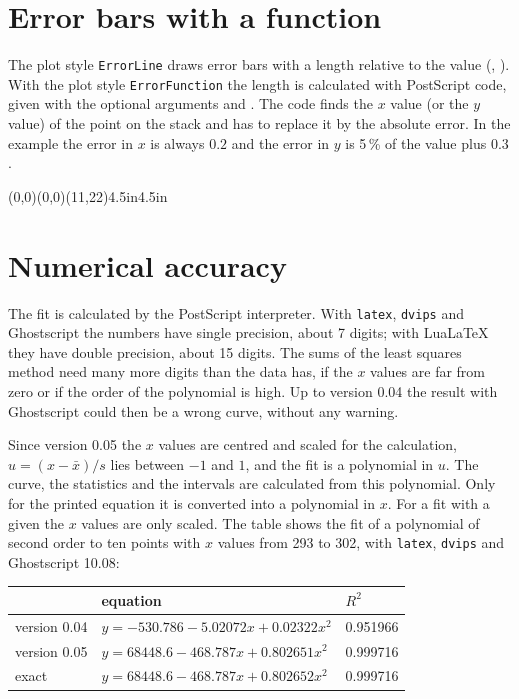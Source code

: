 \documentclass[11pt,english,BCOR10mm,DIV12,bibliography=totoc,parskip=false,
   smallheadings, headexclude,footexclude,oneside]{pst-doc}
\let\Section\section
\def\section{\clearpage\Section}
\begin{document}
\section{Error bars with a function}
The plot style \texttt{ErrorLine} draws error bars with a length relative to
the value (, ). With the plot style
\texttt{ErrorFunction} the length is calculated with PostScript code, given with the
optional arguments  and . The code finds the
$x$ value (or the $y$ value) of the point on the stack and has to replace it by
the absolute error. In the example the error in $x$ is always $0.2$ and
the error in $y$ is 5\,\% of the value plus $0.3$.

\begin{LTXexample}[pos=t]
\begin{psgraph}[arrows=->,Dy=2](0,0)(0,0)(11,22){4.5in}{4.5in}
\listplot[plotstyle=ErrorFunction,arrows=|-|,arrowscale=0.5,
  xerrfunc=pop 0.2,yerrfunc=0.05 mul 0.3 add]{\Calib}
\listplot[plotstyle=dots]{\Calib}
\listplot[decimals=2,EqPos=1 20,plotstyle=GLLSR,linecolor=blue]{\Calib}
\end{psgraph}
\end{LTXexample}

\section{Numerical accuracy}
The fit is calculated by the PostScript interpreter. With \texttt{latex},
\texttt{dvips} and Ghostscript the numbers have single precision, about 7
digits; with Lua\LaTeX{} they have double precision, about 15 digits. The sums
of the least squares method need many more digits than the data has, if the
$x$ values are far from zero or if the order of the polynomial is high.
Up to version 0.04 the result with Ghostscript could then be a wrong curve,
without any warning.

Since version 0.05 the $x$ values are centred and scaled for the calculation,
$u=(x-\bar x)/s$ lies between $-1$ and $1$, and the fit is a polynomial in $u$.
The curve, the statistics and the intervals are calculated from this
polynomial. Only for the printed equation it is converted into a polynomial
in $x$. For a fit with a given  the $x$ values are only scaled.
The table shows the fit of a polynomial of second order to ten points with
$x$ values from 293 to 302, with \texttt{latex}, \texttt{dvips} and Ghostscript 10.08:

\medskip
\begin{tabular}{@{}lll@{}}\hline
 & equation & $R^2$\\\hline
version 0.04 & $y=-530.786-5.02072x+0.02322x^2$ & 0.951966\\
version 0.05 & $y=68448.6-468.787x+0.802651x^2$ & 0.999716\\
exact & $y=68448.6-468.787x+0.802652x^2$ & 0.999716\\\hline
\end{tabular}
\end{document}
